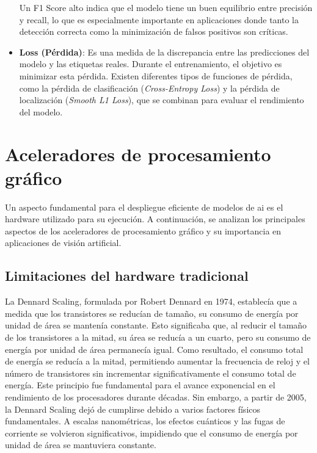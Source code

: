 \documentclass[11pt,spanish,listoffigures,listoftables]{tfgetsinf}
\begin{document}
\begin{itemize}
   Un F1 Score alto indica que el modelo tiene un buen equilibrio entre precisión y recall, lo que es especialmente importante en aplicaciones donde tanto la detección correcta como la minimización de falsos positivos son críticas.

   \item \textbf{Loss (Pérdida)}: Es una medida de la discrepancia entre las predicciones del modelo y las etiquetas reales. Durante el entrenamiento, el objetivo es minimizar esta pérdida. Existen diferentes tipos de funciones de pérdida, como la pérdida de clasificación (\textit{Cross-Entropy Loss}) y la pérdida de localización (\textit{Smooth L1 Loss}), que se combinan para evaluar el rendimiento del modelo.

\end{itemize}


\section{Aceleradores de procesamiento gráfico} \label{sec:hardware}
Un aspecto fundamental para el despliegue eficiente de modelos de \gls{ai} es el hardware utilizado para su ejecución. A continuación, se analizan los principales aspectos de los aceleradores de procesamiento gráfico y su importancia en aplicaciones de visión artificial.

\subsection{Limitaciones del hardware tradicional} \label{sec:limitaciones_hardware}

La Dennard Scaling\cite{dennard1974design}, formulada por Robert Dennard en 1974, establecía que a medida que los transistores se reducían de tamaño, su consumo de energía por unidad de área se mantenía constante. Esto significaba que, al reducir el tamaño de los transistores a la mitad, su área se reducía a un cuarto, pero su consumo de energía por unidad de área permanecía igual. Como resultado, el consumo total de energía se reducía a la mitad, permitiendo aumentar la frecuencia de reloj y el número de transistores sin incrementar significativamente el consumo total de energía. Este principio fue fundamental para el avance exponencial en el rendimiento de los procesadores durante décadas. Sin embargo, a partir de 2005, la Dennard Scaling dejó de cumplirse debido a varios factores físicos fundamentales. A escalas nanométricas, los efectos cuánticos y las fugas de corriente se volvieron significativos, impidiendo que el consumo de energía por unidad de área se mantuviera constante.
\end{document}
